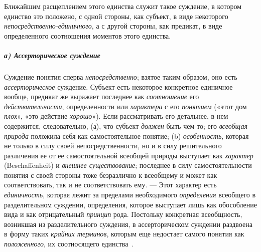 \documentclass[twoside]{article}
\begin{document}
{{Ближайшим расщеплением этого единства служит такое суждение, в
котором единство это положено, с одной стороны, как субъект, в виде
некоторого
{\em непосредственно-единичного},
а с другой стороны, как предикат, в виде определенного
соотношения моментов этого единства.

\subparagraph[а) Ассерторическое суждение]{а) Ассерторическое суждение}
Суждение понятия сперва
{\em непосредственно};
взятое таким образом, оно есть
{\em ассерторическое}
суждение. Субъект есть некоторое конкретное единичное вообще,
предикат же выражает последнее как
{\em соотношение} его
{\em действительности},
определенности или
{\em характера} с его
{\em понятием} («этот дом
{\em плох}», «это
действие {\em хорошо}»).
Если рассматривать его детальнее, в нем содержится,
следовательно, (а), что субъект
{\em должен} быть чем-то;
его {\em всеобщая природа}
положила себя как самостоятельное понятие; (b)
{\em особенность},
которая не только в силу своей непосредственности, но и в
силу решительного различения ее от ее самостоятельной всеобщей природы
выступает как {\em характер}
(Beschaffenheit) и
{\em внешнее существование};
последнее в силу самостоятельности понятия с своей стороны
тоже безразлично к всеобщему и может как соответствовать, так и не
соответствовать ему. — Этот характер есть
{\em единичность},
которая лежит за пределами необходимого
{\em определения}
всеобщего в разделительном суждении, определения, которое
выступает лишь как обособление вида и как отрицательный
{\em принцип} рода.
Постольку конкретная всеобщность, возникшая из разделительного суждения, в
ассерторическом суждении раздвоена в форму таких
{\em крайних терминов},
которым еще недостает самого понятия как
{\em положенного}, их
соотносящего
единства~\label{bkm:bm45}.

}}
\end{document}
